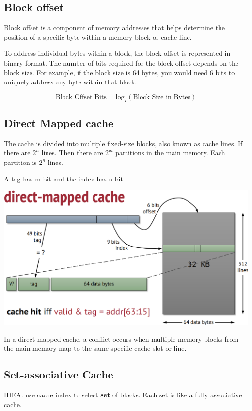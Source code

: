 \documentclass[letterpaper,12pt]{article}
\begin{document}
\subsection{Block offset}
Block offset is a component of memory addresses that helps determine the position of a specific byte within a memory block or cache line.

To address individual bytes within a block, the block offset is represented in binary format. The number of bits required for the block offset depends on the block size.
For example, if the block size is 64 bytes, you would need 6 bits to uniquely address any byte within that block.

\[
    \text{Block Offset Bits} =     \text{log}_2(\text{Block Size in Bytes})
\]

\subsection{Direct Mapped cache}

The cache is divided into multiple fixed-size blocks, also known as cache lines.
If there are $2^n$ lines. Then there are $2^m$ partitions in the main memory. Each partition is $2^n$ lines.

A tag has m bit and the index has n bit.

\includegraphics*[scale = 0.55]{./Image/Direct mapped.png}

In a direct-mapped cache, a conflict occurs when multiple memory blocks from the main memory map to the same specific cache slot or line.

\subsection{Set-associative Cache}

IDEA: use cache index to select \textbf{set} of blocks. Each set is like a fully associative cache.
\end{document}
